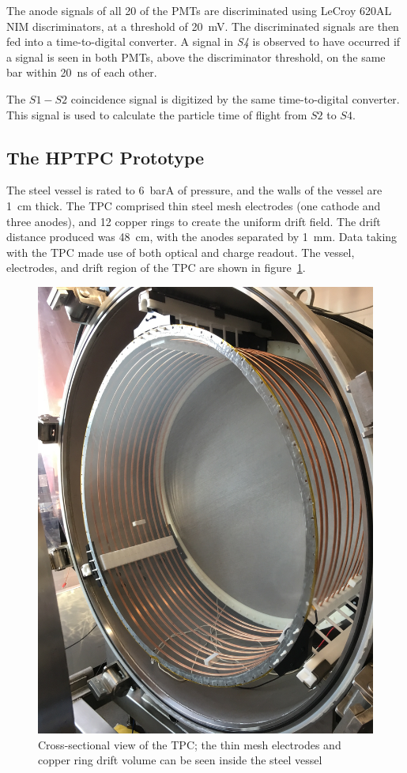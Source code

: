 The anode signals of all 20 of the PMTs are discriminated using LeCroy 620AL NIM discriminators, at a threshold of 20~mV.
The discriminated signals are then fed into a time-to-digital converter. A signal in \textit{S4} is observed to have occurred if a signal is seen in both PMTs, above the discriminator threshold, on the same bar within 20~ns of each other. 

The $\mathit{S1-S2}$ coincidence signal is digitized by the same time-to-digital converter. This signal is used to calculate the particle time of flight from $\mathit{S2}$ to $\mathit{S4}$.

\subsection{The HPTPC Prototype}
The steel vessel is rated to 6~barA of pressure, and the walls of the vessel are 1~cm thick.
The TPC comprised thin steel mesh electrodes (one cathode and three anodes), and 12 copper rings to create the uniform drift field.
The drift distance produced was 48~cm, with the anodes separated by 1~mm. Data taking with the TPC made use of both optical and charge readout.
The vessel, electrodes, and drift region of the TPC are shown in figure~\ref{fig:TPC}.

\begin{figure}
  \centering
  \includegraphics[width=0.6\linewidth]{files/Figures/IMG_1194.jpg}
  \caption{Cross-sectional view of the TPC; the thin mesh electrodes and copper ring drift volume can be seen inside the steel vessel}
  \label{fig:TPC}
\end{figure}


